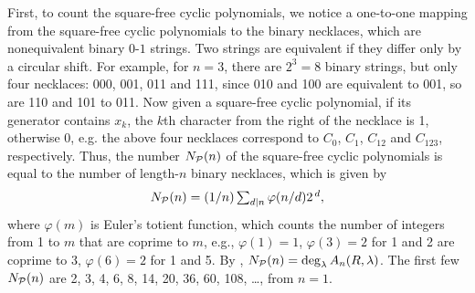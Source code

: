 \documentclass{ws-ijbc}
\begin{document}

First, to count the square-free cyclic polynomials,
  we notice a one-to-one mapping
  from the square-free cyclic polynomials
  to the binary necklaces,
%
which are nonequivalent binary $0$-$1$ strings.
%
Two strings are equivalent if they differ only by a circular shift.
%
For example, for $n = 3$, there are $2^3 = 8$ binary strings,
but only four necklaces: 000, 001, 011 and 111,
since 010 and 100 are equivalent to 001,
so are 110 and 101 to 011.
%
%
Now given a square-free cyclic polynomial, if its generator contains $x_k$,
  the $k$th character from the right of the necklace is 1,
  otherwise 0,
e.g. the above four necklaces correspond to
  $C_0$, $C_1$, $C_{12}$ and $C_{123}$, respectively.
Thus,
%
the number $N_\mathcal P(n)$ of the square-free cyclic polynomials
  is equal to the number of length-$n$ binary necklaces,
  which is given by \cite{riordan}
\begin{equation}
  N_\mathcal P(n) = (1/n) \textstyle\sum_{d|n} \varphi(n/d) 2^{\,d},
\label{eq:necklace}
\end{equation}
%
%
where $\varphi(m)$ is Euler's totient function,
  which counts the number of integers from 1 to $m$
  that are coprime to $m$,
  e.g.,
  $\varphi(1) = 1$,
  $\varphi(3) = 2$ for 1 and 2 are coprime to 3,
  $\varphi(6) = 2$ for 1 and 5.
%
By ,
  $N_\mathcal P(n) = \deg_\lambda A_n(R, \lambda)$.
The first few $N_\mathcal P(n)$ are
2, 3, 4, 6, 8, 14, 20, 36, 60, 108, \dots, %
  from $n = 1$.



\end{document}
